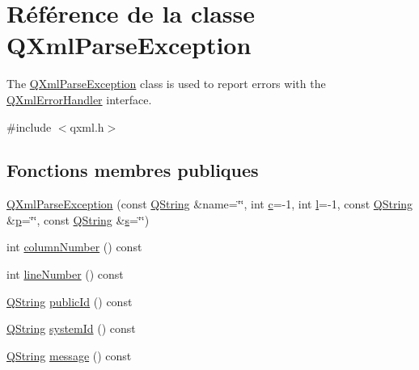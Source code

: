 \hypertarget{class_q_xml_parse_exception}{}\section{Référence de la classe Q\+Xml\+Parse\+Exception}
\label{class_q_xml_parse_exception}


The \hyperlink{class_q_xml_parse_exception}{Q\+Xml\+Parse\+Exception} class is used to report errors with the \hyperlink{class_q_xml_error_handler}{Q\+Xml\+Error\+Handler} interface.  




{\ttfamily \#include $<$qxml.\+h$>$}

\subsection*{Fonctions membres publiques}
\begin{DoxyCompactItemize}
\item 
\hyperlink{class_q_xml_parse_exception_a3ebf6309461dea4ad1df751e8e95ed2b}{Q\+Xml\+Parse\+Exception} (const \hyperlink{class_q_string}{Q\+String} \&name=\char`\"{}\char`\"{}, int \hyperlink{060__command__switch_8tcl_ab14f56bc3bd7680490ece4ad7815465f}{c}=-\/1, int \hyperlink{060__command__switch_8tcl_aff56f84b49947b84b2a304f51cf8e678}{l}=-\/1, const \hyperlink{class_q_string}{Q\+String} \&\hyperlink{060__command__switch_8tcl_a15229b450f26d8fa1c10bea4f3279f4d}{p}=\char`\"{}\char`\"{}, const \hyperlink{class_q_string}{Q\+String} \&\hyperlink{060__command__switch_8tcl_a011c73f2dbb87635a3b4206c72355f6e}{s}=\char`\"{}\char`\"{})
\item 
int \hyperlink{class_q_xml_parse_exception_a1443bedda08626819d6decb2c574b715}{column\+Number} () const 
\item 
int \hyperlink{class_q_xml_parse_exception_ae8e27c76765c18027d9cebd8f089c096}{line\+Number} () const 
\item 
\hyperlink{class_q_string}{Q\+String} \hyperlink{class_q_xml_parse_exception_a0aae20f843f786b2f6a9f0fda7036171}{public\+Id} () const 
\item 
\hyperlink{class_q_string}{Q\+String} \hyperlink{class_q_xml_parse_exception_a0744490f220f68ca5ed2a6d5f868a2ae}{system\+Id} () const 
\item 
\hyperlink{class_q_string}{Q\+String} \hyperlink{class_q_xml_parse_exception_a3288a96ff30c5ddefb53f87a72846ee6}{message} () const 
\end{DoxyCompactItemize}


